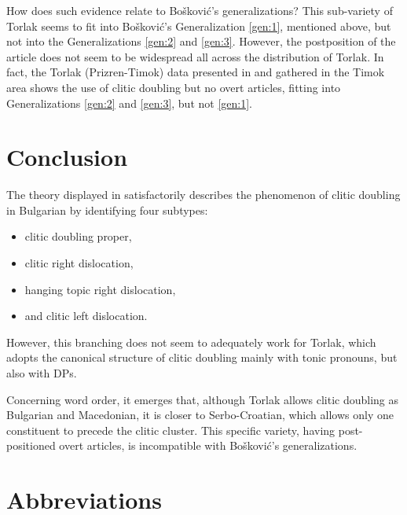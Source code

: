 \documentclass[output=paper,
colorlinks,
citecolor=brown,
newtxmath
]{langscibook}
\begin{document}
How does such evidence relate to Bošković’s generalizations? This sub-variety of Torlak seems to fit into Bošković’s Generalization \ref{gen:1}, mentioned above, but not into the Generalizations \ref{gen:2} and \ref{gen:3}. However, the postposition of the article does not seem to be widespread all across the distribution of Torlak. In fact, the Torlak (Prizren-Timok) data presented in \citet{Runic2014} and gathered in the Timok area shows the use of clitic doubling but no overt articles, fitting into Generalizations \ref{gen:2} and \ref{gen:3}, but not \ref{gen:1}.
%
%
\section{Conclusion}
\label{sec:conclusion}

The theory displayed in \citet{Cinque.Krapova2008} satisfactorily describes the phenomenon of clitic doubling in Bulgarian by identifying four subtypes:
\begin{itemize}
\item clitic doubling proper,
\item clitic right dislocation,
\item hanging topic right dislocation,
\item and clitic left dislocation.
\end{itemize}
However, this branching does not seem to adequately work for Torlak, which adopts the canonical structure of clitic doubling mainly with tonic pronouns, but also with DPs.

Concerning word order, it emerges that, although Torlak allows clitic doubling as Bulgarian and Macedonian, it is closer to Serbo-Croatian, which allows only one constituent to precede the clitic cluster. This specific variety, having post-positioned overt articles, is incompatible with Bošković’s generalizations.


\section*{Abbreviations}
\end{document}

